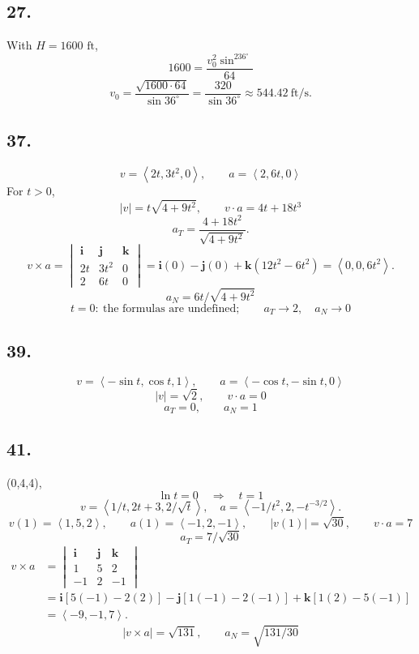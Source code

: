\documentclass[11pt]{article}
\newcommand{\ex}[1]{\subsection*{#1.}}
\newcommand{\ans}[1]{\boxed{#1}}
\newcommand{\vv}[1]{\left\langle #1\right\rangle}
\newcommand{\ii}{\mathbf i}\newcommand{\jj}{\mathbf j}\newcommand{\kk}{\mathbf k}
\newcommand{\cp}[6]{\begin{vmatrix}\ii&\jj&\kk\\#1&#2&#3\\#4&#5&#6\end{vmatrix}}
\begin{document}
\ex{27}
With $H=1600\text{ ft}$,
\[1600=\frac{v_0^2\sin^236^\circ}{64}\]
\[\ans{v_0=\frac{\sqrt{1600\cdot64}}{\sin36^\circ}=\frac{320}{\sin36^\circ}\approx544.42\ \mathrm{ft/s}}.\]
\ex{37}
\[v=\vv{2t,3t^2,0},\qquad a=\vv{2,6t,0}\]
For $t>0$,
\[|v|=t\sqrt{4+9t^2},\qquad v\cdot a=4t+18t^3\]
\[\ans{a_T=\frac{4+18t^2}{\sqrt{4+9t^2}}}.\]
\[v\times a=\cp{2t}{3t^2}{0}{2}{6t}{0}=\ii(0)-\jj(0)+\kk(12t^2-6t^2)=\vv{0,0,6t^2}.\]
\[\ans{a_N=6t/\sqrt{4+9t^2}}\]
\[t=0:\ \text{the formulas are undefined};\qquad a_T\to2,\quad a_N\to0\]
\ex{39}
\[v=\vv{-\sin t,\cos t,1},\qquad a=\vv{-\cos t,-\sin t,0}\]
\[|v|=\sqrt2,\qquad v\cdot a=0\]
\[\ans{a_T=0},\qquad \ans{a_N=1}\]
\ex{41}
(0,4,4),
\[\ln t=0\quad\Longrightarrow\quad t=1\]
\[v=\vv{1/t,2t+3,2/\sqrt t},\quad a=\vv{-1/t^2,2,-t^{-3/2}}.\]
\[v(1)=\vv{1,5,2},\qquad a(1)=\vv{-1,2,-1},\qquad |v(1)|=\sqrt{30},\qquad v\cdot a=7\]
\[\ans{a_T=7/\sqrt{30}}\]
\begin{align*}v\times a&=\cp{1}{5}{2}{-1}{2}{-1}\\&=\ii[5(-1)-2(2)]-\jj[1(-1)-2(-1)]+\kk[1(2)-5(-1)]\\&=\vv{-9,-1,7}.
\end{align*}
\[|v\times a|=\sqrt{131},\qquad \ans{a_N=\sqrt{131/30}}\]
\end{document}
